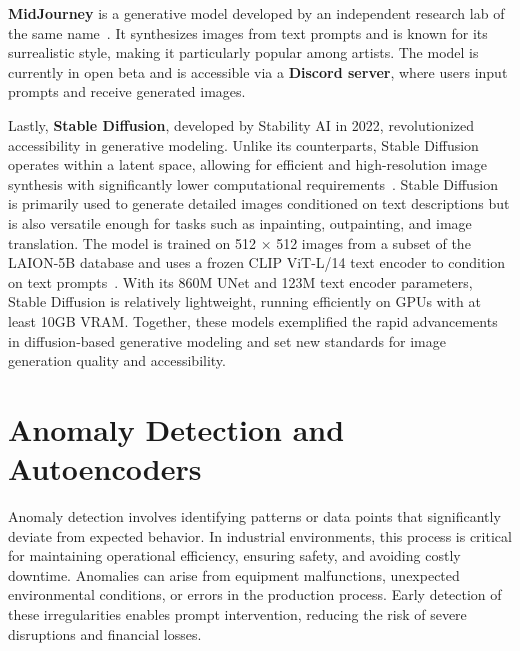 \documentclass[12pt,DIV14,BCOR12mm,a4paper,footinclude=false,headinclude,parskip=half-,twoside,openright,cleardoublepage=empty,toc=index,bibliography=totoc,listof=totoc]{scrreprt}
\numberwithin{equation}{chapter}
\begin{document}
\textbf{MidJourney} is a generative model developed by an independent research lab of the same name~\cite{midjourney2022}. It synthesizes images from text prompts and is known for its surrealistic style, making it particularly popular among artists. The model is currently in open beta and is accessible via a \textbf{Discord server}, where users input prompts and receive generated images.

Lastly, \textbf{Stable Diffusion}, developed by Stability AI in 2022, revolutionized accessibility in generative modeling. Unlike its counterparts, Stable Diffusion operates within a latent space, allowing for efficient and high-resolution image synthesis with significantly lower computational requirements~\cite{Latent_Diffusion}. Stable Diffusion is primarily used to generate detailed images conditioned on text descriptions but is also versatile enough for tasks such as inpainting, outpainting, and image translation. The model is trained on 512 × 512 images from a subset of the LAION-5B database and uses a frozen CLIP ViT-L/14 text encoder to condition on text prompts~\cite{stable_diffusion}. With its 860M UNet and 123M text encoder parameters, Stable Diffusion is relatively lightweight, running efficiently on GPUs with at least 10GB VRAM. Together, these models exemplified the rapid advancements in diffusion-based generative modeling and set new standards for image generation quality and accessibility.

\section{Anomaly Detection and Autoencoders}

Anomaly detection involves identifying patterns or data points that significantly deviate from expected behavior. In industrial environments, this process is critical for maintaining operational efficiency, ensuring safety, and avoiding costly downtime. Anomalies can arise from equipment malfunctions, unexpected environmental conditions, or errors in the production process. Early detection of these irregularities enables prompt intervention, reducing the risk of severe disruptions and financial losses.
\end{document}
